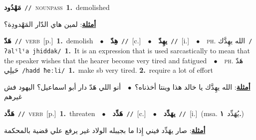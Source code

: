 \documentclass[10pt,a4paper,twoside]{article} %
\begin{document}
\begin{multicols}{2}
{\setlength\topsep{0pt}\textbf{\foreignlanguage{arabic}{مَهْدُود}}\ {\color{gray}\texttt{//}\color{black}}\ \textsc{noun\textunderscore pass}\ \textbf{1.}~demolished\  \begin{flushright}\color{gray}\foreignlanguage{arabic}{\textbf{\underline{\foreignlanguage{arabic}{أمثلة}}}: لمين هاي الدّار المَهْدودِة؟}\end{flushright}\color{black}} \vspace{2mm}

{\setlength\topsep{0pt}\textbf{\foreignlanguage{arabic}{هَدّ}}\ {\color{gray}\texttt{//}\color{black}}\ \textsc{verb}\ [p.]\ \textbf{1.}~demolish\ \ $\bullet$\ \ \setlength\topsep{0pt}\textbf{\foreignlanguage{arabic}{هِدّ}}\ {\color{gray}\texttt{//}\color{black}}\ [c.]\ \ $\bullet$\ \ \setlength\topsep{0pt}\textbf{\foreignlanguage{arabic}{يهِدّ}}\ {\color{gray}\texttt{//}\color{black}}\ [i.]\ \ $\bullet$\ \ \textsc{ph.} \color{gray} \foreignlanguage{arabic}{الله يهِدَّك}\color{black}\ {\color{gray}\texttt{/{\sffamily ʔalˤlˤa jhiddak}/}\color{black}}\ \textbf{1.}~It is an expression that is used sarcastically to mean that the speaker wishes that the hearer become very tired and fatigued\ \ $\bullet$\ \ \textsc{ph.} \color{gray} \foreignlanguage{arabic}{هَدّ حَيلِي}\color{black}\ {\color{gray}\texttt{/{\sffamily hadd ħeːli}/}\color{black}}\ \textbf{1.}~make sb very tired.  \textbf{2.}~require a lot of effort\  \begin{flushright}\color{gray}\foreignlanguage{arabic}{\textbf{\underline{\foreignlanguage{arabic}{أمثلة}}}: الله يهِدَّك يا خالد هذا وينتا أخذناه؟\ $\bullet$\ \  أنو اللي هَدّ دار أبو اسماعيل؟ اليهود فش غيرهم}\end{flushright}\color{black}} \vspace{2mm}

{\setlength\topsep{0pt}\textbf{\foreignlanguage{arabic}{هَدَّد}}\ {\color{gray}\texttt{//}\color{black}}\ \textsc{verb}\ [p.]\ \textbf{1.}~threaten\ \ $\bullet$\ \ \setlength\topsep{0pt}\textbf{\foreignlanguage{arabic}{هَدِّد}}\ {\color{gray}\texttt{//}\color{black}}\ [c.]\ \ $\bullet$\ \ \setlength\topsep{0pt}\textbf{\foreignlanguage{arabic}{يهَدِّد}}\ {\color{gray}\texttt{//}\color{black}}\ [i.]\ \color{gray}(msa. \foreignlanguage{arabic}{يُهَدِّد}~\foreignlanguage{arabic}{\textbf{١.}})\color{black}\  \begin{flushright}\color{gray}\foreignlanguage{arabic}{\textbf{\underline{\foreignlanguage{arabic}{أمثلة}}}: صار يهَدِّد فيني إِذا ما بجيبله الولاد غير يرفع علي قضية بالمحكمة}\end{flushright}\color{black}} \vspace{2mm}


\end{multicols}
\end{document}
